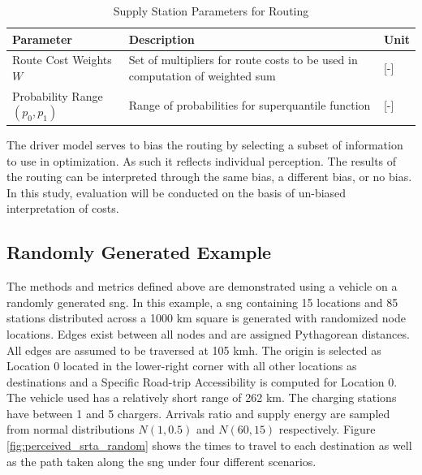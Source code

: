 \documentclass[11pt]{article}
\begin{document}
\begin{multicols}{2}
\begin{table}[H]
	\centering
	\caption{Supply Station Parameters for Routing}
	\label{tab:param_driver}
	\begin{tabular}{|C{/8}|C{/8}|C{/8}|}
		\hline Parameter & Description & Unit \\
		\hline Route Cost Weights $W$ & Set of multipliers for route costs to be used in computation of weighted sum & [-] \\
		\hline Probability Range $(p_0, p_1)$ & Range of probabilities for superquantile function & [-] \\
		\hline
	\end{tabular}
\end{table}

The driver model serves to bias the routing by selecting a subset of information to use in optimization. As such it reflects individual perception. The results of the routing can be interpreted through the same bias, a different bias, or no bias. In this study, evaluation will be conducted on the basis of un-biased interpretation of costs.

\subsection*{Randomly Generated Example}

The methods and metrics defined above are demonstrated using a vehicle on a randomly generated \gls{sng}. In this example, a \gls{sng} containing 15 locations and 85 stations distributed across a 1000 km square is generated with randomized node locations. Edges exist between all nodes and are assigned Pythagorean distances. All edges are assumed to be traversed at 105 kmh. The origin is selected as Location 0 located in the lower-right corner with all other locations as destinations and a Specific Road-trip Accessibility is computed for Location 0. The vehicle used has a relatively short range of 262 km. The charging stations have between 1 and 5 chargers. Arrivals ratio and supply energy are sampled from normal distributions $N(1, 0.5)$ and $N(60, 15)$ respectively. Figure \ref{fig:perceived_srta_random} shows the times to travel to each destination as well as the path taken along the \gls{sng} under four different scenarios.


\end{multicols}
\end{document}
